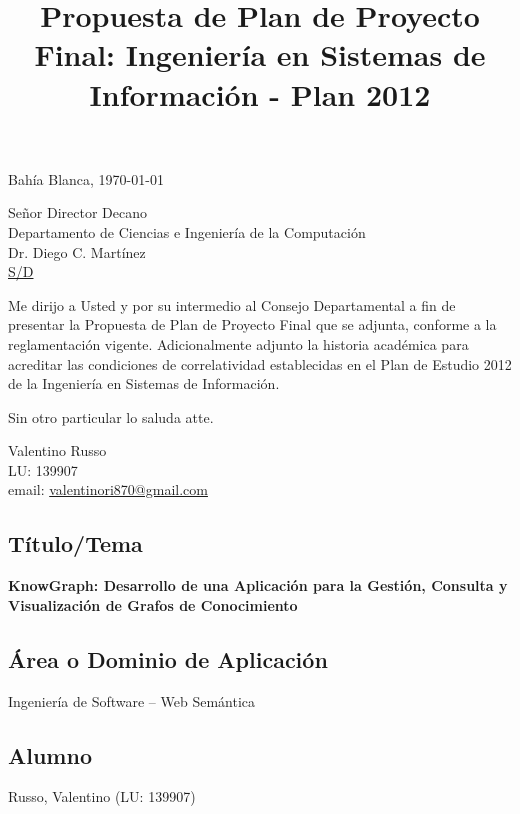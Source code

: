 \documentclass{article}
\title{Propuesta de Plan de Proyecto Final: Ingeniería en Sistemas de Información - Plan 2012}
\begin{document}
\thispagestyle{empty}
\vspace{2cm}

\begin{flushright}
Bahía Blanca, \today
\end{flushright}

\vspace{0.5cm}
\noindent
Señor Director Decano\\
Departamento de Ciencias e Ingeniería de la Computación\\
Dr. Diego C. Martínez\\
\underline{S/D}

\vspace{1cm}

Me dirijo a Usted y por su intermedio al Consejo Departamental a fin de presentar la Propuesta de Plan de Proyecto Final que se adjunta, conforme a la reglamentación vigente. Adicionalmente adjunto la historia académica para acreditar las condiciones de correlatividad establecidas en el Plan de Estudio 2012 de la Ingeniería en Sistemas de Información.

Sin otro particular lo saluda atte.

\vspace{2cm}

\begin{flushleft}
Valentino Russo\\
LU: 139907\\
email: \href{mailto:valentinori870@gmail.com}{valentinori870@gmail.com}
\end{flushleft}

\newpage

\maketitle
\subsection*{Título/Tema}
\textbf{KnowGraph: Desarrollo de una Aplicación para la Gestión, Consulta y Visualización de Grafos de Conocimiento}

\subsection*{Área o Dominio de Aplicación}
Ingeniería de Software – Web Semántica

\subsection*{Alumno}
Russo, Valentino (LU: 139907)
\end{document}
